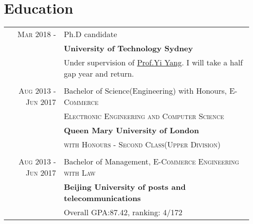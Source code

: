 \documentclass[a4paper,10pt]{article}
\begin{document}
\section{Education}
\begin{tabular}{rl}	

 \textsc{Mar 2018} - \textsc{} & Ph.D candidate\\
& \textbf{University of Technology Sydney}\\
& Under supervision of \href{https://sites.google.com/site/ianyyang2016/}{Prof.Yi Yang}. I will take a half gap year and return.\\
\\
 \textsc{Aug 2013} - \textsc{Jun 2017} & Bachelor of Science(Engineering) with Honours, \textsc{E-Commerce}\\
&\textsc{Electronic Engineering and} \textsc{Computer Science}\\
& \textbf{Queen Mary University of London}\\
& \textsc{with Honours - Second Class(Upper Division)}  \\
\\

 \textsc{Aug 2013} - \textsc{Jun 2017} & Bachelor of Management, \textsc{E-Commerce Engineering with Law}\\
& \textbf{Beijing University of posts and telecommunications}\\
& Overall GPA:\textsc{87.42}, ranking: \textsc{4/172}  \\

\end{tabular}

\end{document}
